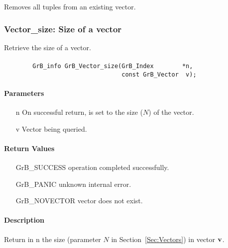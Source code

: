 Removes all tuples from an existing vector.

\subsubsection{{\sf Vector\_size}: Size of a vector}

Retrieve the size of a vector.

\paragraph{\syntax}

\begin{verbatim}
        GrB_info GrB_Vector_size(GrB_Index        *n,
                                 const GrB_Vector  v);
\end{verbatim}

\paragraph{Parameters}

\begin{itemize}[leftmargin=1.1in]
    \item[{\sf n}] On successful return, is set to the size ($N$) of the vector.
    \item[{\sf v}] Vector being queried.
\end{itemize}

\paragraph{Return Values}

\begin{itemize}[leftmargin=2.1in]
\item[{\sf GrB\_SUCCESS}]   operation completed successfully.
\item[{\sf GrB\_PANIC}]     unknown internal error.
\item[{\sf GrB\_NOVECTOR}]  vector does not exist.
\end{itemize}

\paragraph{Description}

Return in {\sf n} the size (parameter $N$ in Section~\ref{Sec:Vectors}) in vector ${\bf v}$.

